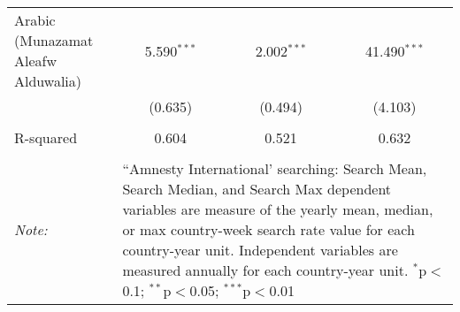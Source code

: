 \begin{table}[!htbp]
\begin{tabular}{@{\extracolsep{5pt}}lccc}
  Arabic (Munazamat Aleafw Alduwalia) & 5.590$^{***}$ & 2.002$^{***}$ & 41.490$^{***}$ \\ 
  & (0.635) & (0.494) & (4.103) \\ 
 \hline \\[-1.8ex] 
R-squared  & 0.604 & 0.521 & 0.632 \\ 
\hline 
\hline \\[-1.8ex] 
\textit{Note:}  & \multicolumn{3}{l}{\parbox[t]{8cm}{``Amnesty International' searching: Search Mean, Search Median, and Search Max dependent variables are measure of the yearly mean, median, or max country-week search rate value for each country-year unit. Independent variables are measured annually for each country-year unit. $^{*}$p$<$0.1; $^{**}$p$<$0.05; $^{***}$p$<$0.01}} \\ 
\end{tabular} 
\end{table} 
